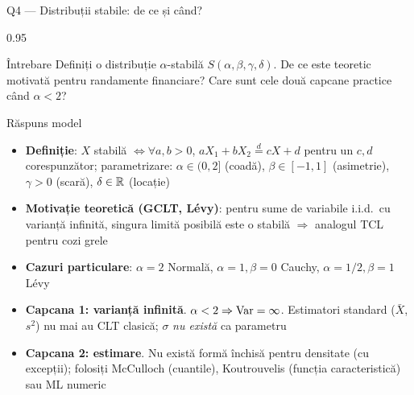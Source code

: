 \documentclass[9pt, aspectratio=169, t]{beamer}
\begin{document}
\begin{frame}[shrink=25]{Q4 --- Distribuții stabile: de ce și când?}
\begin{cminipage}{0.95\textwidth}
\begin{block}{Întrebare}
Definiți o distribuție $\alpha$-stabilă $S(\alpha, \beta, \gamma, \delta)$. De ce este teoretic motivată pentru randamente financiare? Care sunt cele două capcane practice când $\alpha < 2$?
\end{block}
\begin{exampleblock}{Răspuns model}
\begin{itemize}\setlength{\itemsep}{0pt}
    \item \textbf{Definiție}: $X$ stabilă $\iff \forall a, b > 0$, $aX_1 + bX_2 \stackrel{d}{=} cX + d$ pentru un $c, d$ corespunzător; parametrizare: $\alpha \in (0, 2]$ (coadă), $\beta \in [-1, 1]$ (asimetrie), $\gamma > 0$ (scară), $\delta \in \mathbb{R}$ (locație)
    \item \textbf{Motivație teoretică (GCLT, Lévy)}: pentru sume de variabile i.i.d.\ cu varianță infinită, singura limită posibilă este o stabilă $\Rightarrow$ analogul TCL pentru cozi grele
    \item \textbf{Cazuri particulare}: $\alpha = 2$ Normală, $\alpha = 1, \beta = 0$ Cauchy, $\alpha = 1/2, \beta = 1$ Lévy
    \item \textbf{Capcana 1: varianță infinită}. $\alpha < 2 \Rightarrow \text{Var} = \infty$. Estimatori standard ($\bar X$, $s^2$) nu mai au CLT clasică; $\sigma$ \emph{nu există} ca parametru
    \item \textbf{Capcana 2: estimare}. Nu există formă închisă pentru densitate (cu excepții); folosiți McCulloch (cuantile), Koutrouvelis (funcția caracteristică) sau ML numeric
\end{itemize}
\end{exampleblock}
\end{cminipage}
\end{frame}
\end{document}
